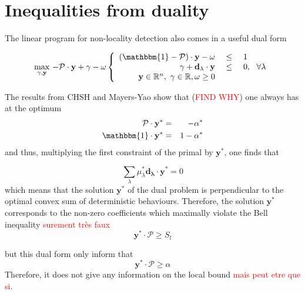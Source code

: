 \section{Inequalities from duality}

The linear program for non-locality detection also comes in a useful dual form 

\begin{equation}
    \displaystyle{ \max_{\gamma,\mathbf{y}} \,  - \mathcal{P}\cdot \mathbf{y} + \gamma - \omega  } \\

\left\{
\begin{array}{rcl}
 (\mathbbm{1} - \mathcal{P} ) \cdot \mathbf{y}  - \omega &\ \leq \ & 1\\
 \gamma + \mathbf{d_\lambda} \cdot \mathbf{y} &\ \leq \ & 0 , \ \ \forall \lambda\\

\mathbf{y} \in \mathbb{R}^n ,\ \gamma \in \mathbb{R}, \omega \geq 0  & & 
\end{array}
\right.
\label{eq:dual}

\end{equation}


The results from CHSH and Mayers-Yao show that (\textcolor{red}{FIND WHY}) one always has at the optimum 
\begin{eqnarray}
\mathcal{P} \cdot \mathbf{y}^* &=& - \alpha^* \\
\mathbbm{1} \cdot \mathbf{y}^* &=&  1 - \alpha^*
\end{eqnarray}
and thus, multiplying the first constraint of the primal by $\mathbf{y}^*$, one finds that

\begin{equation}
    \displaystyle{\sum_\lambda} \mu^*_\lambda \mathbf{d_\lambda} \cdot \mathbf{y}^* = 0 
\end{equation}
which means that the solution $\mathbf{y}^*$ of the dual problem is perpendicular to the optimal convex sum of deterministic behaviours. Therefore, the solution $\mathbf{y}^*$ corresponds to the non-zero coefficients which maximally violate the Bell inequality \textcolor{red}{surement très faux }
\begin{equation}
    \mathbf{y}^* \cdot \mathcal{P} \geq S_l 
\end{equation}

but this dual form only inform that 
\begin{equation*}
        \mathbf{y}^* \cdot \mathcal{P} \geq \alpha 
\end{equation*}
Therefore, it does not give any information on the local bound \textcolor{red}{mais peut etre que si}. 

